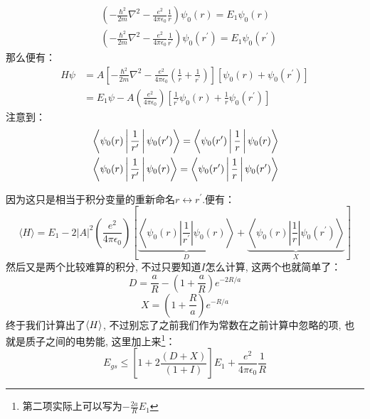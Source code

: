 \documentclass[a4paper,zihao=-4,linespread=1]{ctexrep}
\begin{document}
    \begin{equation}
        \label{eq:8.15}
        \begin{aligned}
        &\left(-\frac{\hbar^{2}}{2 m} \nabla^{2}-\frac{e^{2}}{4 \pi \epsilon_{0}} \frac{1}{r}\right) \psi_{0}(r)=E_{1} \psi_{0}(r)\\
        &\left(-\frac{\hbar^{2}}{2 m} \nabla^{2}-\frac{e^{2}}{4 \pi \epsilon_{0}} \frac{1}{r^\prime}\right) \psi_{0}(r^\prime)=E_{1} \psi_{0}(r^\prime)
        \end{aligned}
    \end{equation}
    那么便有：
    \begin{equation}
        \begin{aligned}
            H \psi & =A\left[-\frac{\hbar^{2}}{2 m} \nabla^{2}-\frac{e^{2}}{4 \pi \epsilon_{0}}\left(\frac{1}{r}+\frac{1}{r^{\prime}}\right)\right]\left[\psi_{0}(r)+\psi_{0}\left(r^{\prime}\right)\right] \\
            & =E_{1} \psi-A\left(\frac{e^{2}}{4 \pi \epsilon_{0}}\right)\left[\frac{1}{r^{\prime}} \psi_{0}(r)+\frac{1}{r} \psi_{0}\left(r^{\prime}\right)\right] 
        \end{aligned}
    \end{equation}
    注意到：
    \begin{equation}
        \label{eq:8.17}
        \begin{aligned}
            &\Braket{\psi_0(r)|\frac{1}{r^\prime}|\psi_0(r^\prime)}=\Braket{\psi_0(r^\prime)|\frac{1}{r}|\psi_0(r)}\\
            &\Braket{\psi_0(r)|\frac{1}{r^\prime}|\psi_0(r)}=\Braket{\psi_0(r^\prime)|\frac{1}{r}|\psi_0(r^\prime)}
        \end{aligned}
    \end{equation}
    
    因为这只是相当于积分变量的重新命名$r\leftrightarrow r^\prime$.便有：
    \begin{equation*}
        \langle H\rangle=E_{1}-2|A|^{2}\left(\frac{e^{2}}{4 \pi \epsilon_{0}}\right)\left[\underbrace{\left\langle\psi_{0}(r)\left|\frac{1}{r^{\prime}}\right| \psi_{0}(r)\right\rangle}_D+\underbrace{ \left\langle\psi_{0}(r)\left|\frac{1}{r}\right| \psi_{0}\left(r^{\prime}\right)\right\rangle}_X\right]
    \end{equation*}
    然后又是两个比较难算的积分, 不过只要知道$I$怎么计算, 这两个也就简单了：
    \begin{equation}
        \label{eq:8.18}
        D=\frac{a}{R}-\left(1+\frac{a}{R}\right) e^{-2 R / a}
    \end{equation}
    \begin{equation}
        \label{eq:8.19}
        X=\left(1+\frac{R}{a}\right) e^{-R / a}
    \end{equation}
    终于我们计算出了$\braket{H}$, 不过别忘了之前我们作为常数在之前计算中忽略的项, 也就是质子之间的电势能, 这里加上来\footnote{第二项实际上可以写为$-\frac{2a}{R}E_1$}：
    \begin{equation}
        \label{eq:8.20}
        E_{gs}\leq\left[1+2 \frac{(D+X)}{(1+I)}\right] E_{1}+\frac{e^{2}}{4 \pi \epsilon_{0}} \frac{1}{R}
    \end{equation}
    
\end{document}
